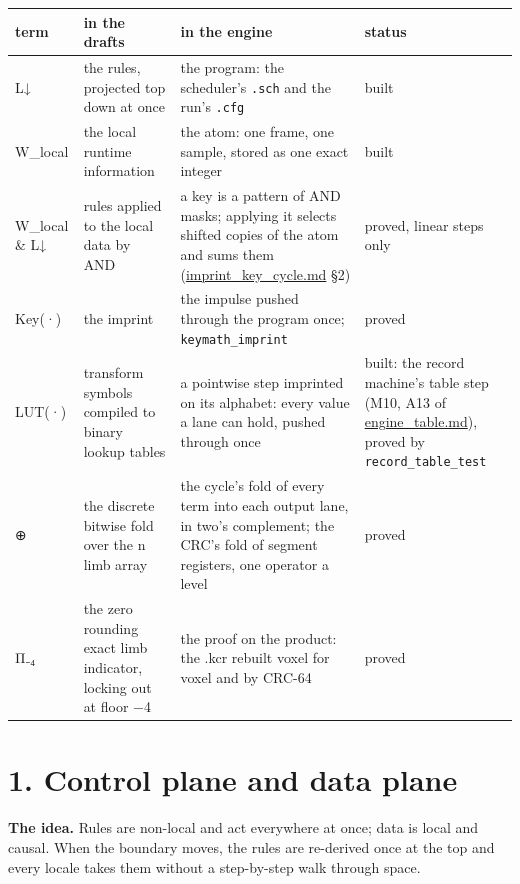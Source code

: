 {\footnotesize
\setlength{\tabcolsep}{6pt}
\begin{longtable}{>{\RaggedRight\arraybackslash}p{}>{\RaggedRight\arraybackslash}p{}>{\RaggedRight\arraybackslash}p{}>{\RaggedRight\arraybackslash}p{}}
\toprule
term & in the drafts & in the engine & status \\
\midrule
\endhead
L↓ & the rules, projected top down at once & the program: the scheduler's \texttt{.\allowbreak{}sch} and the run's \texttt{.\allowbreak{}cfg} & built \\
W\_\allowbreak{}local & the local runtime information & the atom: one frame, one sample, stored as one exact integer & built \\
W\_\allowbreak{}local \& L↓ & rules applied to the local data by AND & a key is a pattern of AND masks; applying it selects shifted copies of the atom and sums them (\hyperref[chap:imprint-key-cycle]{imprint\_\allowbreak{}key\_\allowbreak{}cycle.md} §2) & proved, linear steps only \\
Key(·) & the imprint & the impulse pushed through the program once; \texttt{keymath\_\allowbreak{}imprint} & proved \\
LUT(·) & transform symbols compiled to binary lookup tables & a pointwise step imprinted on its alphabet: every value a lane can hold, pushed through once & built: the record machine's table step (M10, A13 of \hyperref[chap:engine-table]{engine\_\allowbreak{}table.md}), proved by \texttt{record\_\allowbreak{}table\_\allowbreak{}test} \\
⊕ & the discrete bitwise fold over the n limb array & the cycle's fold of every term into each output lane, in two's complement; the CRC's fold of segment registers, one operator a level & proved \\
Π₋₄ & the zero rounding exact limb indicator, locking out at floor −4 & the proof on the product: the .kcr rebuilt voxel for voxel and by CRC-64 & proved \\
\bottomrule
\end{longtable}
}

\section{\texorpdfstring{1. Control plane and data plane}{1. Control plane and data plane}}

\textbf{The idea.} Rules are non-local and act everywhere at once; data is local and causal. When the boundary moves, the rules are re-derived once at the top and every locale takes them without a step-by-step walk through space.


